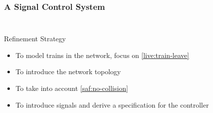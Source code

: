 \begin{frame}
  \frametitle{A Signal Control System}

  \begin{columns}
    \begin{column}{0.55\textwidth}
      \begin{figure}
        \centering
        
      \end{figure}
    \end{column}
    \hspace{-2em}
    \begin{column}{0.6\textwidth}
      {
        \setReqCounter
        \begin{requirements}
          \ReqSpacing
        \end{requirements}
      }
    \end{column}
  \end{columns}
  \medskip

  \pause

  \begin{block}{Refinement Strategy}
    \begin{itemize}
    \item[Model 0] To model trains in the network, focus on \alert{\ref{live:train-leave}}
    \item[Ref. 1] To introduce the network topology
    \item[Ref. 2] To take into account \alert{\ref{saf:no-collision}}
    \item[Ref. 3] To introduce signals and derive a specification for the controller
    \end{itemize}
  \end{block}
\end{frame}


